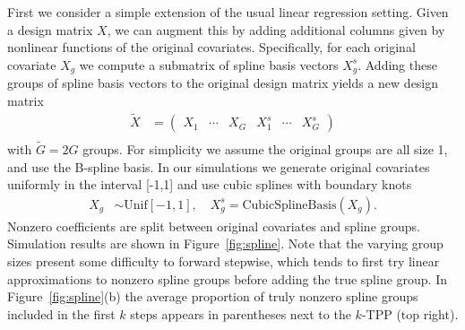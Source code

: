 \documentclass{imsart}
\begin{document}
First we consider a simple extension of the usual linear regression setting. Given a design matrix $X$, we can augment this by adding additional columns given by nonlinear functions of the original covariates. Specifically, for each original covariate $X_g$ we compute a submatrix of spline basis vectors $X_g^s$. Adding these groups of spline basis vectors to the original design matrix yields a new design matrix
\begin{equation}
\label{eq:splinemat}
  \begin{aligned}
    \tilde X &=  \begin{pmatrix} X_1 & \cdots & X_G & X^s_1 & \cdots & X^s_G  \end{pmatrix}\\
  \end{aligned}
\end{equation}
with $\tilde G = 2G$ groups. For simplicity we assume the original groups are all size 1, and use the B-spline basis. In our simulations we generate original covariates uniformly in the interval [-1,1] and use cubic splines with boundary knots
\begin{equation}
  \begin{aligned}
    X_g &\sim \text{Unif}[-1,1], \quad
    X_g^s = \text{CubicSplineBasis}(X_g).
  \end{aligned}
\end{equation}
Nonzero coefficients are split between original covariates and spline groups. Simulation results are shown in Figure~\ref{fig:spline}. Note that the varying group sizes present some difficulty to forward stepwise, which tends to first try linear approximations to nonzero spline groups before adding the true spline group. In Figure~\ref{fig:spline}(b) the average proportion of truly nonzero spline groups included in the first $k$ steps appears in parentheses next to the $k$-TPP (top right).
\end{document}
